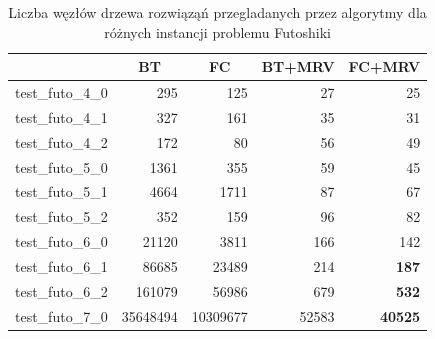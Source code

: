 \documentclass{article}
\begin{document}
	\begin{table}[H]
		\caption{Liczba węzłów drzewa rozwiąząń przegladanych przez algorytmy dla różnych instancji problemu Futoshiki}
		\label{tab:solutions_futo}
		\begin{center}
			\begin{tabular}{|l|r|r|r|r|}
				\hline
				& \multicolumn{1}{c|}{\textbf{BT}} & \multicolumn{1}{c|}{\textbf{FC}} & \multicolumn{1}{c|}{\textbf{BT+MRV}} & \multicolumn{1}{c|}{\textbf{FC+MRV}} \\ \hline
				test\_futo\_4\_0 & 295                              & 125                              & 27                                   & 25                                   \\ \hline
				test\_futo\_4\_1 & 327                              & 161                              & 35                                   & 31                                   \\ \hline
				test\_futo\_4\_2 & 172                              & 80                               & 56                                   & 49                                   \\ \hline
				test\_futo\_5\_0 & 1361                             & 355                              & 59                                   & 45                                   \\ \hline
				test\_futo\_5\_1 & 4664                             & 1711                             & 87                                   & 67                                   \\ \hline
				test\_futo\_5\_2 & 352                              & 159                              & 96                                   & 82                                   \\ \hline
				test\_futo\_6\_0 & 21120                            & 3811                             & 166                                  & 142                                  \\ \hline
				test\_futo\_6\_1 & 86685                            & 23489                            & 214                                  & \textbf{187}                         \\ \hline
				test\_futo\_6\_2 & 161079                           & 56986                            & 679                                  & \textbf{532}                         \\ \hline
				test\_futo\_7\_0 & 35648494                         & 10309677                         & 52583                                & \textbf{40525}                       \\ \hline

\end{tabular}
\end{center}
\end{table}
\end{document}

